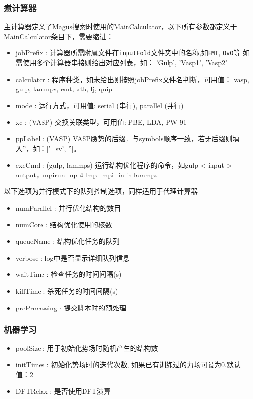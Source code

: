 \documentclass[12pt]{article}
\newcommand{\file}[1]{\texttt{#1}}
\begin{document}
\subsubsection{煮计算器}
主计算器定义了Magus搜索时使用的MainCalculator，以下所有参数都定义于MainCalculator条目下，需要缩进：
\begin{itemize}
    \item jobPrefix         : 计算器所需附属文件在\file{inputFold}文件夹中的名称,如\file{EMT}, \file{OvO}等
    如需使用多个计算器串接则给出对应列表，如：['Gulp', 'Vasp1', 'Vasp2']\label{jobprefix}
    \item calculator        : 程序种类，如未给出则按照jobPrefix文件名判断，可用值：
    {vasp, gulp, lammps, emt, xtb, lj, quip}
    \item mode              : 运行方式，可用值: serial (串行), parallel (并行)
    \item xc                : (VASP) 交换关联类型，可用值: PBE, LDA, PW-91
    \item ppLabel           : (VASP) VASP赝势的后缀，与symbols顺序一致，若无后缀则填入''，如：['\_sv', '']。
    \item exeCmd            : (gulp, lammps) 运行结构优化程序的命令，如gulp < input > output，mpirun -np 4 lmp\_mpi -in in.lammps
\end{itemize}
以下选项为并行模式下的队列控制选项，同样适用于代理计算器
\begin{itemize}
    \item numParallel       : 并行优化结构的数目
    \item numCore           : 结构优化使用的核数
    \item queueName         : 结构优化任务的队列
    \item verbose           : log中是否显示详细队列信息
    \item waitTime          : 检查任务的时间间隔(s)
    \item killTime          : 杀死任务的时间间隔(s)
    \item preProcessing     : 提交脚本时的预处理
\end{itemize}

\subsubsection{机器学习}
\begin{itemize}
    \item poolSize          : 用于初始化势场时随机产生的结构数
    \item initTimes         : 初始化势场时的迭代次数, 如果已有训练过的力场可设为0.默认值：2 
    \item DFTRelax          : 是否使用DFT演算
\end{itemize} 
\end{document}
